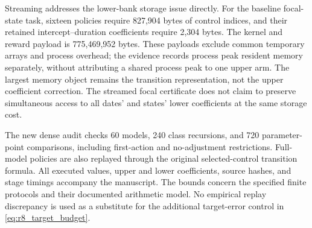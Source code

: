 Streaming addresses the lower-bank storage issue directly. For the baseline focal-state task, sixteen policies require 827,904 bytes of control indices, and their retained intercept--duration coefficients require 2,304 bytes. The kernel and reward payload is 775,469,952 bytes. These payloads exclude common temporary arrays and process overhead; the evidence records process peak resident memory separately, without attributing a shared process peak to one upper arm. The largest memory object remains the transition representation, not the upper coefficient correction. The streamed focal certificate does not claim to preserve simultaneous access to all dates' and states' lower coefficients at the same storage cost.

The new dense audit checks 60 models, 240 class recursions, and 720 parameter-point comparisons, including first-action and no-adjustment restrictions. Full-model policies are also replayed through the original selected-control transition formula. All executed values, upper and lower coefficients, source hashes, and stage timings accompany the manuscript. The bounds concern the specified finite protocols and their documented arithmetic model. No empirical replay discrepancy is used as a substitute for the additional target-error control in \eqref{eq:r8_target_budget}.
